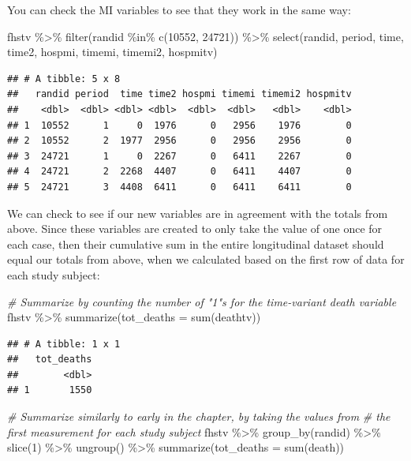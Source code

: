 \documentclass[
]{book}
\newenvironment{Shaded}{\begin{snugshade}}{\end{snugshade}}
\newcommand{\AttributeTok}[1]{\textcolor[rgb]{0.77,0.63,0.00}{#1}}
\newcommand{\CommentTok}[1]{\textcolor[rgb]{0.56,0.35,0.01}{\textit{#1}}}
\newcommand{\DecValTok}[1]{\textcolor[rgb]{0.00,0.00,0.81}{#1}}
\newcommand{\FunctionTok}[1]{\textcolor[rgb]{0.00,0.00,0.00}{#1}}
\newcommand{\NormalTok}[1]{#1}
\newcommand{\SpecialCharTok}[1]{\textcolor[rgb]{0.00,0.00,0.00}{#1}}
\begin{document}
You can check the MI variables to see that they work in the same way:

\begin{Shaded}
\begin{Highlighting}[]
\NormalTok{fhstv }\SpecialCharTok{\%\textgreater{}\%} 
  \FunctionTok{filter}\NormalTok{(randid }\SpecialCharTok{\%in\%} \FunctionTok{c}\NormalTok{(}\DecValTok{10552}\NormalTok{, }\DecValTok{24721}\NormalTok{)) }\SpecialCharTok{\%\textgreater{}\%} 
  \FunctionTok{select}\NormalTok{(randid, period, time, time2, hospmi, timemi, timemi2, hospmitv)}
\end{Highlighting}
\end{Shaded}

\begin{verbatim}
## # A tibble: 5 x 8
##   randid period  time time2 hospmi timemi timemi2 hospmitv
##    <dbl>  <dbl> <dbl> <dbl>  <dbl>  <dbl>   <dbl>    <dbl>
## 1  10552      1     0  1976      0   2956    1976        0
## 2  10552      2  1977  2956      0   2956    2956        0
## 3  24721      1     0  2267      0   6411    2267        0
## 4  24721      2  2268  4407      0   6411    4407        0
## 5  24721      3  4408  6411      0   6411    6411        0
\end{verbatim}

We can check to see if our new variables are in agreement with the totals from above. Since these variables are created to only take the value of one once for each case, then their cumulative sum in the entire longitudinal dataset should equal our totals from above, when we calculated based on the first row of data for each study subject:

\begin{Shaded}
\begin{Highlighting}[]
\CommentTok{\# Summarize by counting the number of "1"s for the time{-}variant death variable}
\NormalTok{fhstv }\SpecialCharTok{\%\textgreater{}\%} 
  \FunctionTok{summarize}\NormalTok{(}\AttributeTok{tot\_deaths =} \FunctionTok{sum}\NormalTok{(deathtv))}
\end{Highlighting}
\end{Shaded}

\begin{verbatim}
## # A tibble: 1 x 1
##   tot_deaths
##        <dbl>
## 1       1550
\end{verbatim}

\begin{Shaded}
\begin{Highlighting}[]
\CommentTok{\# Summarize similarly to early in the chapter, by taking the values from }
\CommentTok{\# the first measurement for each study subject}
\NormalTok{fhstv }\SpecialCharTok{\%\textgreater{}\%} 
  \FunctionTok{group\_by}\NormalTok{(randid) }\SpecialCharTok{\%\textgreater{}\%} 
  \FunctionTok{slice}\NormalTok{(}\DecValTok{1}\NormalTok{) }\SpecialCharTok{\%\textgreater{}\%} 
  \FunctionTok{ungroup}\NormalTok{() }\SpecialCharTok{\%\textgreater{}\%} 
  \FunctionTok{summarize}\NormalTok{(}\AttributeTok{tot\_deaths =} \FunctionTok{sum}\NormalTok{(death))}
\end{Highlighting}
\end{Shaded}
\end{document}
